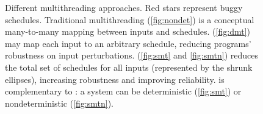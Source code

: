 \begin{figure}[t]
\begin{center}
\vspace{-.05in}
\caption{Different multithreading approaches. Red stars represent buggy
schedules.  Traditional multithreading (\ref{fig:nondet}) is a conceptual
many-to-many mapping between inputs and schedules.  \dmt (\ref{fig:dmt}) may 
map each input to an arbitrary schedule, reducing programs' robustness on input 
perturbations.  \smt (\ref{fig:smt} and \ref{fig:smtn}) reduces the total set 
of schedules for all inputs (represented by the shrunk ellipses), increasing 
robustness and improving reliability. \smt is complementary to \dmt: a \smt 
system can be deterministic (\ref{fig:smt}) or nondeterministic 
(\ref{fig:smtn}).}
\vspace{-.2in}
\end{center}
\end{figure}

